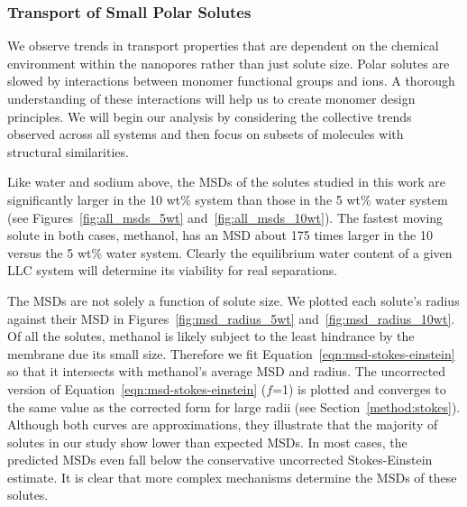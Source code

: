 \documentclass[journal=jpcbfk,manuscript=article]{achemso}
\begin{document}
 \subsubsection{Transport of Small Polar Solutes}\label{section:general_transport_solutes}  
  
  We observe trends in transport properties that are dependent on the chemical 
  environment within the nanopores rather than just solute size. Polar solutes
  are slowed by interactions between monomer functional groups and ions. 
  A thorough understanding of these interactions will help us to create monomer
  design principles. We will begin our analysis by considering the collective
  trends observed across all systems and then focus on subsets of molecules
  with structural similarities.
  
  Like water and sodium above, the MSDs of the solutes studied in this work are 
  significantly larger in the 10 wt\% system than those in the 5 wt\% water 
  system (see Figures~\ref{fig:all_msds_5wt} and~\ref{fig:all_msds_10wt}). The fastest moving solute in both cases, 
  methanol, has an MSD about 175 times larger in the 10 versus the 5 wt\%
  water system. Clearly the equilibrium water content of a given LLC system will 
  determine its viability for real separations.
  
  The MSDs are not solely a function of solute size. We plotted each solute's radius
  against their MSD in Figures~\ref{fig:msd_radius_5wt} and~\ref{fig:msd_radius_10wt}.
  Of all the solutes, methanol is likely subject to the least hindrance by
  the membrane due its small size. Therefore we fit Equation~\ref{eqn:msd-stokes-einstein}
  so that it intersects with methanol's average MSD and radius. The uncorrected version of 
  Equation~\ref{eqn:msd-stokes-einstein} ($f$=1) is plotted and converges to the same value as the
  corrected form for large radii (see Section~\ref{method:stokes}). Although both curves are 
  approximations, they illustrate that the majority of solutes in our study show
  lower than expected MSDs. In most cases, the predicted MSDs even fall below the 
  conservative uncorrected Stokes-Einstein estimate. It is clear that more complex
  mechanisms determine the MSDs of these solutes.
  
\end{document}
